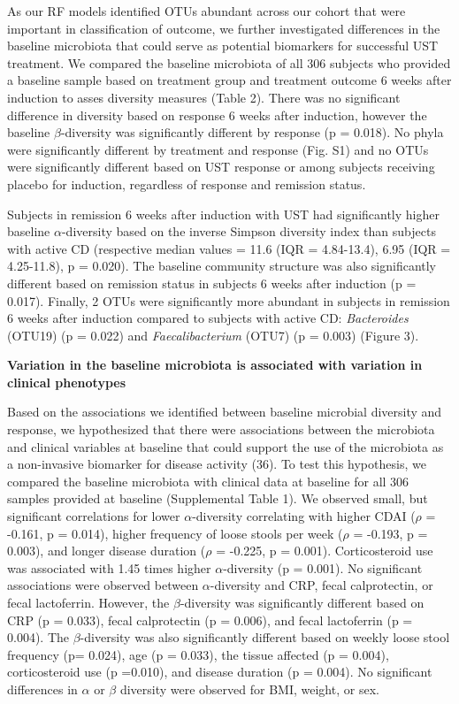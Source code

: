 \documentclass[12pt,]{article}
\begin{document}
As our RF models identified OTUs abundant across our cohort that were
important in classification of outcome, we further investigated
differences in the baseline microbiota that could serve as potential
biomarkers for successful UST treatment. We compared the baseline
microbiota of all 306 subjects who provided a baseline sample based on
treatment group and treatment outcome 6 weeks after induction to asses
diversity measures (Table 2). There was no significant difference in
diversity based on response 6 weeks after induction, however the
baseline \({\beta}\)-diversity was significantly different by response
(p = 0.018). No phyla were significantly different by treatment and
response (Fig. S1) and no OTUs were significantly different based on UST
response or among subjects receiving placebo for induction, regardless
of response and remission status.

Subjects in remission 6 weeks after induction with UST had significantly
higher baseline \({\alpha}\)-diversity based on the inverse Simpson
diversity index than subjects with active CD (respective median values =
11.6 (IQR = 4.84-13.4), 6.95 (IQR = 4.25-11.8), p = 0.020). The baseline
community structure was also significantly different based on remission
status in subjects 6 weeks after induction (p = 0.017). Finally, 2 OTUs
were significantly more abundant in subjects in remission 6 weeks after
induction compared to subjects with active CD: \emph{Bacteroides}
(OTU19) (p = 0.022) and \emph{Faecalibacterium} (OTU7) (p = 0.003)
(Figure 3).

\textbf{Variation in the baseline microbiota is associated with
variation in clinical phenotypes}

Based on the associations we identified between baseline microbial
diversity and response, we hypothesized that there were associations
between the microbiota and clinical variables at baseline that could
support the use of the microbiota as a non-invasive biomarker for
disease activity (36). To test this hypothesis, we compared the baseline
microbiota with clinical data at baseline for all 306 samples provided
at baseline (Supplemental Table 1). We observed small, but significant
correlations for lower \({\alpha}\)-diversity correlating with higher
CDAI (\({\rho}\) = -0.161, p = 0.014), higher frequency of loose stools
per week (\({\rho}\) = -0.193, p = 0.003), and longer disease duration
(\({\rho}\) = -0.225, p = 0.001). Corticosteroid use was associated with
1.45 times higher \({\alpha}\)-diversity (p = 0.001). No significant
associations were observed between \({\alpha}\)-diversity and CRP, fecal
calprotectin, or fecal lactoferrin. However, the \({\beta}\)-diversity
was significantly different based on CRP (p = 0.033), fecal calprotectin
(p = 0.006), and fecal lactoferrin (p = 0.004). The
\({\beta}\)-diversity was also significantly different based on weekly
loose stool frequency (p= 0.024), age (p = 0.033), the tissue affected
(p = 0.004), corticosteroid use (p =0.010), and disease duration (p =
0.004). No significant differences in \({\alpha}\) or \({\beta}\)
diversity were observed for BMI, weight, or sex.
\end{document}
